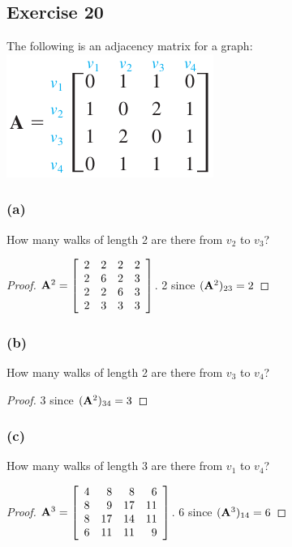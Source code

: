 \documentclass[14pt]{extarticle}
\begin{document}
\subsection{Exercise 20}
The following is an adjacency matrix for a graph: \includegraphics[scale=0.5]{../images/10.2.20.png}

\subsubsection{(a)}
How many walks of length 2 are there from \(v_2\) to \(v_3\)?
\begin{proof}
\({\bf A}^2 = 
\left[ 
\begin{array}{rrrr}
2 & 2 & 2 & 2 \\
2 & 6 & 2 & 3 \\
2 & 2 & 6 & 3 \\
2 & 3 & 3 & 3 \\
\end{array}
\right]
\). 2 since \(({\bf A}^2)_{23} = 2\)
\end{proof}

\subsubsection{(b)}
How many walks of length 2 are there from \(v_3\) to \(v_4\)?
\begin{proof}
3 since \(({\bf A}^2)_{34} = 3\)
\end{proof}

\subsubsection{(c)}
How many walks of length 3 are there from \(v_1\) to \(v_4\)?
\begin{proof}
\({\bf A}^3 = 
\left[ 
\begin{array}{rrrr}
4 & 8 & 8 & 6 \\
8 & 9 & 17 & 11 \\
8 & 17 & 14 & 11 \\
6 & 11 & 11 & 9 \\
\end{array}
\right]
\). 6 since \(({\bf A}^3)_{14} = 6\)
\end{proof}
\end{document}
